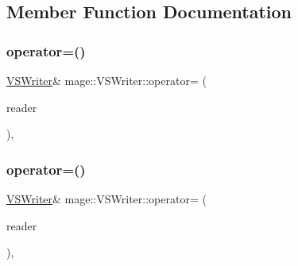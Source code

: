 \subsection{Member Function Documentation}
\hypertarget{classmage_1_1_v_s_writer_a3c961e3ef27f93b5ecf953c81844f6c6}{}\label{classmage_1_1_v_s_writer_a3c961e3ef27f93b5ecf953c81844f6c6} 
\subsubsection{\texorpdfstring{operator=()}{operator=()}\hspace{0.1cm}{\footnotesize\ttfamily [1/2]}}
{\footnotesize\ttfamily \hyperlink{classmage_1_1_v_s_writer}{V\+S\+Writer}\& mage\+::\+V\+S\+Writer\+::operator= (\begin{DoxyParamCaption}\item[{const \hyperlink{classmage_1_1_v_s_writer}{V\+S\+Writer} \&}]{reader }\end{DoxyParamCaption})\hspace{0.3cm}{\ttfamily [private]}, {\ttfamily [delete]}}

\hypertarget{classmage_1_1_v_s_writer_a33859922757212edae1010fce699e3af}{}\label{classmage_1_1_v_s_writer_a33859922757212edae1010fce699e3af} 
\subsubsection{\texorpdfstring{operator=()}{operator=()}\hspace{0.1cm}{\footnotesize\ttfamily [2/2]}}
{\footnotesize\ttfamily \hyperlink{classmage_1_1_v_s_writer}{V\+S\+Writer}\& mage\+::\+V\+S\+Writer\+::operator= (\begin{DoxyParamCaption}\item[{\hyperlink{classmage_1_1_v_s_writer}{V\+S\+Writer} \&\&}]{reader }\end{DoxyParamCaption})\hspace{0.3cm}{\ttfamily [private]}, {\ttfamily [delete]}}

\hypertarget{classmage_1_1_v_s_writer_afda5e71bc0c5c836ab439e2572dcd685}{}\label{classmage_1_1_v_s_writer_afda5e71bc0c5c836ab439e2572dcd685} 
